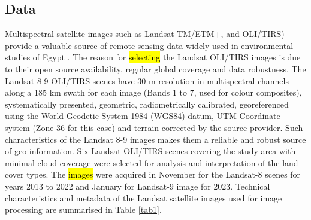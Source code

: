 \documentclass[information,article,submit,pdftex,moreauthors]{Definitions/mdpi}
\begin{document}
\subsection{Data}

Multispectral satellite images such as Landsat TM/ETM+, and OLI/TIRS) provide a valuable source of remote sensing data widely used in environmental studies of Egypt \cite{Elfadaly,Sultanetal1986,Sultanetal1987}. The reason for \hl{selecting } the Landsat OLI/TIRS images is due to their open source availability, regular global coverage and data robustness. The Landsat 8-9 OLI/TIRS scenes have 30-m resolution in multispectral channels along a 185 km swath for each image (Bands 1 to 7, used for colour composites), systematically presented, geometric, radiometrically calibrated, georeferenced using the World Geodetic System 1984 (WGS84) datum, UTM Coordinate system (Zone 36 for this case) and terrain corrected by the source provider. Such characteristics of the Landsat 8-9 images makes them a reliable and robust source of geo-information. Six Landsat OLI/TIRS scenes covering the study area with minimal cloud coverage were selected for analysis and interpretation of the land cover types. The \hl{images } were acquired in November for the Landsat-8 scenes for years 2013 to 2022 and January for Landsat-9 image for 2023. Technical characteristics and metadata of the Landsat satellite images used for image processing are summarised in Table \ref{tab1}. 
\end{document}

